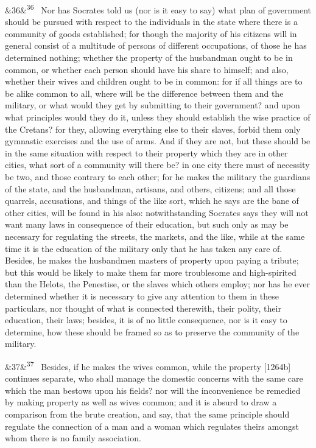 \documentclass[12pt]{article}
\newcommand{\para}[1][]{\par\noindent\ifx&#1&\else\textsuperscript{\footnotesize #1}~\fi}
\begin{document}
\para[36] Nor has Socrates told us (nor is it easy to say) what plan of government should be pursued with respect to the individuals in the state where there is a community of goods established; for though the majority of his citizens will in general consist of a multitude of persons of different occupations, of those he has determined nothing; whether the property of the husbandman ought to be in common, or whether each person should have his share to himself; and also, whether their wives and children ought to be in common: for if all things are to be alike common to all, where will be the difference between them and the military, or what would they get by submitting to their government? and upon what principles would they do it, unless they should establish the wise practice of the Cretans? for they, allowing everything else to their slaves, forbid them only gymnastic exercises and the use of arms. And if they are not, but these should be in the same situation with respect to their property which they are in other cities, what sort of a community will there be? in one city there must of necessity be two, and those contrary to each other; for he makes the military the guardians of the state, and the husbandman, artisans, and others, citizens; and all those quarrels, accusations, and things of the like sort, which he says are the bane of other cities, will be found in his also: notwithstanding Socrates says they will not want many laws in consequence of their education, but such only as may be necessary for regulating the streets, the markets, and the like, while at the same time it is the education of the military only that he has taken any care of. Besides, he makes the husbandmen masters of property upon paying a tribute; but this would be likely to make them far more troublesome and high-spirited than the Helots, the Penestise, or the slaves which others employ; nor has he ever determined whether it is necessary to give any attention to them in these particulars, nor thought of what is connected therewith, their polity, their education, their laws; besides, it is of no little consequence, nor is it easy to determine, how these should be framed so as to preserve the community of the military.

\para[37] Besides, if he makes the wives common, while the property [1264b] continues separate, who shall manage the domestic concerns with the same care which the man bestows upon his fields? nor will the inconvenience be remedied by making property as well as wives common; and it is absurd to draw a comparison from the brute creation, and say, that the same principle should regulate the connection of a man and a woman which regulates theirs amongst whom there is no family association.
\end{document}
